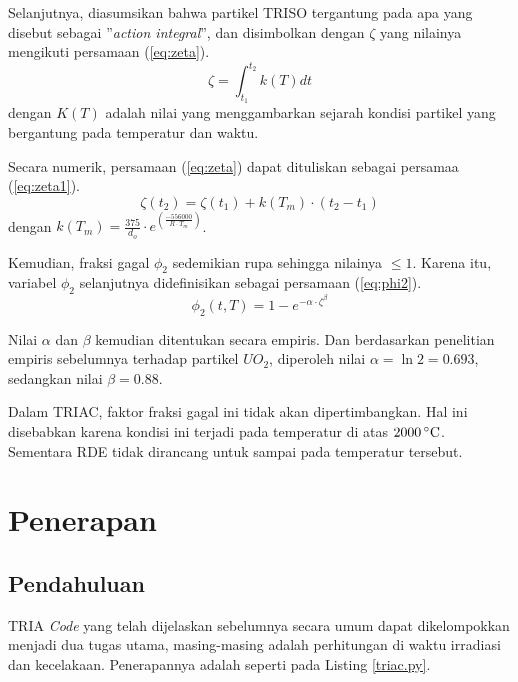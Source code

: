 \documentclass[a4paper,11pt]{report}
\begin{document}
Selanjutnya, diasumsikan bahwa partikel TRISO tergantung pada apa yang disebut sebagai ''\textit{action integral}'', dan disimbolkan dengan $\zeta$ yang nilainya mengikuti persamaan (\ref{eq:zeta}).
\begin{equation}
  \zeta=\int_{t_1}^{t_2} k(T) dt
  \label{eq:zeta}
\end{equation}
dengan $K(T)$ adalah nilai yang menggambarkan sejarah kondisi partikel yang bergantung pada temperatur dan waktu.

Secara numerik, persamaan (\ref{eq:zeta}) dapat dituliskan sebagai persamaa (\ref{eq:zeta1}).
\begin{equation}
  \zeta(t_2)=\zeta(t_1)+k(T_m) \cdot (t_2 - t_1)
  \label{eq:zeta1}
\end{equation}
dengan $k(T_m)=\frac{375}{d_o} \cdot e^{\left(\frac{-556000}{R \cdot T_m}\right)}$.

Kemudian, fraksi gagal $\phi_2$ sedemikian rupa sehingga nilainya $\leq 1$. Karena itu, variabel $\phi_2$ selanjutnya didefinisikan sebagai persamaan (\ref{eq:phi2}).
\begin{equation}
\phi_2(t,T)=1-e^{-\alpha \cdot \zeta^{\beta}}
\label{eq:phi2}
\end{equation}

Nilai $\alpha$ dan $\beta$ kemudian ditentukan secara empiris. Dan berdasarkan penelitian empiris sebelumnya terhadap partikel $UO_2$, diperoleh nilai $\alpha=\ln 2=0.693$, sedangkan nilai $\beta=0.88$.

Dalam TRIAC, faktor fraksi gagal ini tidak akan dipertimbangkan. Hal ini disebabkan karena kondisi ini terjadi pada temperatur di atas $2000\,^{\circ}{\rm C}$. Sementara RDE tidak dirancang untuk sampai pada temperatur tersebut.

\chapter{Penerapan}
\section{Pendahuluan}
TRIA \textit{Code} yang telah dijelaskan sebelumnya secara umum dapat dikelompokkan menjadi dua tugas utama, masing-masing adalah perhitungan di waktu irradiasi dan kecelakaan. Penerapannya adalah seperti pada Listing \ref{triac.py}.

\scriptsize

\normalsize
\end{document}
